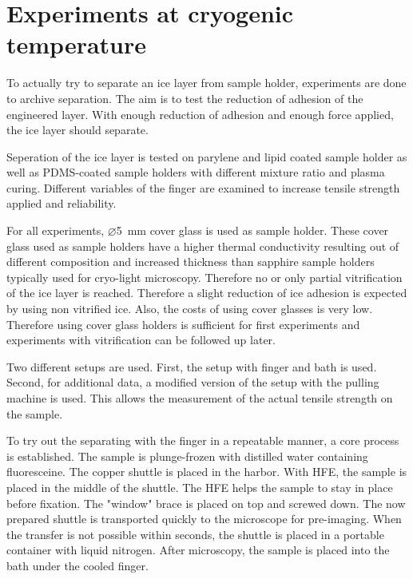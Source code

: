 \FloatBarrier

\section{Experiments at cryogenic temperature}

To actually try to separate an ice layer from sample holder, experiments are done to archive separation. The aim is to test the reduction of adhesion of the engineered layer. With enough reduction of adhesion and enough force applied, the ice layer should separate.

Seperation of the ice layer is tested on parylene and lipid coated sample holder as well as PDMS-coated sample holders with different mixture ratio and plasma curing. Different variables of the finger are examined to increase tensile strength applied and reliability.

For all experiments, $\varnothing$\SI{5}{\milli\meter} cover glass is used as sample holder. These cover glass used as sample holders have a higher thermal conductivity resulting out of different composition and increased thickness than sapphire sample holders typically used for cryo-light microscopy. Therefore no or only partial vitrification of the ice layer is reached. Therefore a slight reduction of ice adhesion is expected by using non vitrified ice. Also, the costs of using cover glasses is very low. Therefore using cover glass holders is sufficient for first experiments and experiments with vitrification can be followed up later.

Two different setups are used. First, the setup with finger and bath is used. Second, for additional data, a modified version of the setup with the pulling machine is used. This allows the measurement of the actual tensile strength on the sample. 

To try out the separating with the finger in a repeatable manner, a core process is established. The sample is plunge-frozen with distilled water containing fluoresceine. The copper shuttle is placed in the harbor. With HFE, the sample is placed in the middle of the shuttle. The HFE helps the sample to stay in place before fixation. The "window" brace is placed on top and screwed down. The now prepared shuttle is transported quickly to the microscope for pre-imaging. When the transfer is not possible within seconds, the shuttle is placed in a portable container with liquid nitrogen. After microscopy, the sample is placed into the bath under the cooled finger. 

